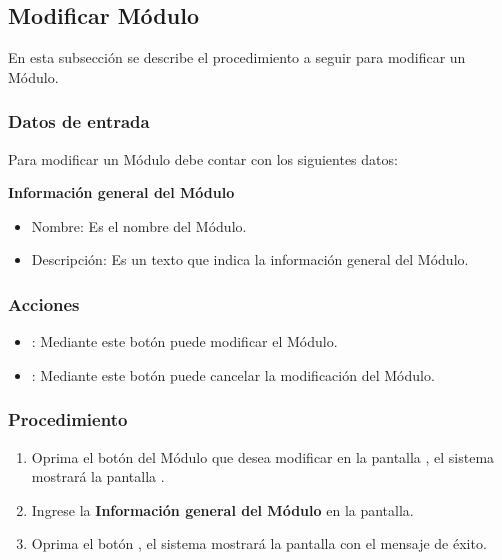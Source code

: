 \subsection{Modificar Módulo}

En esta subsección se describe el procedimiento a seguir para modificar un Módulo.


\subsubsection{Datos de entrada}
\begin{description}
	\item Para modificar un Módulo debe contar con los siguientes datos: \hspace{10pt}
	
	\begin{description}
	    \item \textbf{Información general del Módulo}
	    \begin{itemize}
		  \item Nombre: Es el nombre del Módulo.
		  \item Descripción: Es un texto que indica la información general del Módulo.
	    \end{itemize}
	 \end{description}
\end{description}

\subsubsection{Acciones}
\begin{itemize}
  \item {}: Mediante este botón puede modificar el Módulo.
  \item {}: Mediante este botón puede cancelar la modificación del Módulo.
\end{itemize}

\subsubsection{Procedimiento}
\begin{enumerate}
	\item Oprima el botón \btnEditar del Módulo que desea modificar en la pantalla , el sistema mostrará la pantalla . 

	
	\item Ingrese la \textbf{Información general del Módulo} en la pantalla.
	
	\item Oprima el botón , el sistema mostrará la pantalla  con el mensaje de éxito.
\end{enumerate}

